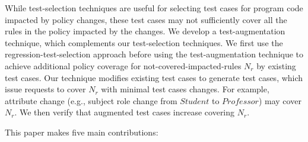 While test-selection techniques are useful for selecting test cases for program code impacted by policy changes, these test cases may not sufficiently cover all the rules in the policy impacted by the changes.
We develop a test-augmentation technique, which complements our test-selection techniques.
We first use the regression-test-selection approach before using the test-augmentation technique to achieve
additional policy coverage for not-covered-impacted-rules $N_r$ by existing test cases.
Our technique modifies existing test cases to generate test cases, which issue requests to cover $N_r$ with minimal test cases changes. For example, attribute change (e.g., subject role change from $Student$ to $Professor$) may cover $N_r$. We then verify that augmented test cases increase covering $N_r$.





This paper makes five main contributions:

